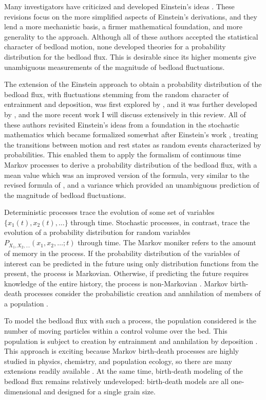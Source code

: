 Many investigators have criticized and developed Einstein's ideas \citep{Paintal1971, Yalin1972, Shen1980, Lisle1998, Papanicolaou2002, Sun2000, Ancey2006, Armanini2015}. 
These revisions focus on the more simplified aspects of Einstein's derivations, and they lend a more mechanistic basis, a firmer mathematical foundation, and more generality to the approach. 
Although all of these authors accepted the statistical character of bedload motion, none developed theories for a probability distribution for the bedload flux. 
This is desirable since its higher moments give unambiguous measurements of the magnitude of bedload fluctuations. 

The extension of the Einstein approach to obtain a probability distribution of the bedload flux, with fluctuations stemming from the random character of entrainment and deposition, was first explored by \citet{Lisle1998, Sun2000}, and it was further developed by \citet{Ancey2006}, and the more recent work I will discuss extensively in this review.   
All of these authors revisited Einstein's ideas from a foundation in the stochastic mathematics which became formalized somewhat after Einstein's work \citep[e.g.][]{Cox1965}, treating the transitions between motion and rest states as random events characterized by probabilities. 
This enabled them to apply the formalism of continuous time Markov processes to derive a probability distribution of the bedload flux, with a mean value which was an improved version of the \citet{Einstein1950} formula, very similar to the revised formula of \citet{Yalin1972}, and a variance which provided an unambiguous prediction of the magnitude of bedload fluctuations. 

Deterministic processes trace the evolution of some set of variables $\{x_1(t),x_2(t),\dots\}$ through time. 
Stochastic processes, in contrast, trace the evolution of a probability distribution for random variables $P_{X_1,X_2,\dots}(x_1,x_2,\dots;t)$ through time. 
The Markov moniker refers to the amount of memory in the process.
If the probability distribution of the variables of interest can be predicted in the future using only distribution functions from the present, the process is Markovian. 
Otherwise, if predicting the future requires knowledge of the entire history, the process is non-Markovian \citep{Cox1965, VanKampen1992}. 
Markov birth-death processes consider the probabilistic creation and annhilation of members of a population \citep{Cox1965, VanKampen1992}.  

To model the bedload flux with such a process, the population considered is the number of moving particles within a control volume over the bed. 
This population is subject to creation by entrainment and annhilation by deposition \citep{Ancey2008, Turowski2009, Heyman2013, Ma2014,  Ancey2014a, Ancey2015}. 
This approach is exciting because Markov birth-death processes are highly studied in physics, chemistry, and population ecology, so there are many extensions readily available \citep{Bailey1968, Cox1965, Pielou1977, VandenBroek2012, VanKampen1992, Gillespie1992, Field2010, Mendez2015}. 
At the same time, birth-death modeling of the bedload flux remains relatively undeveloped: birth-death models are all one-dimensional and designed for a single grain size. 

